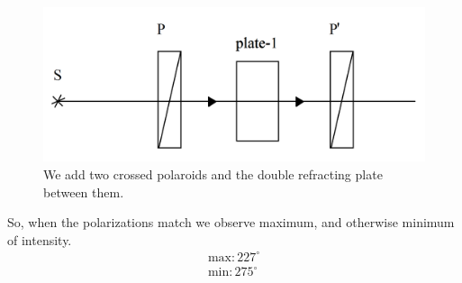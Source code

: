 \begin{minipage}{0.55\textwidth}
    \begin{figure}[h]
    \centering
    \includegraphics[width=1\textwidth]{images/crystplast.png}
    \caption{We add two crossed polaroids and the double refracting plate between them.}
\end{figure}
\end{minipage}
\hfill
\begin{minipage}{0.35\textwidth}
    So, when the polarizations match we observe maximum, and otherwise minimum of intensity.
    \begin{align*}
        \text{max} \colon 227^\circ\\
        \text{min} \colon 275^\circ
    \end{align*}
\end{minipage}
